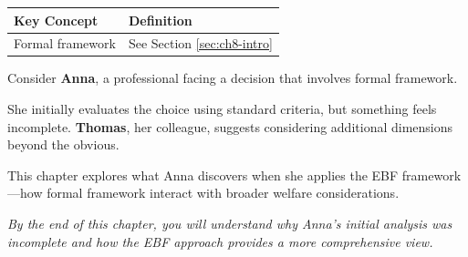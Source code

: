 %
%
%
%
%


\begin{tcolorbox}[
    colback=gray!5!white,
    colframe=gray!75!black,
    title={\textbf{Begriffe in diesem Kapitel}},
    fonttitle=\bfseries
]
\small
\begin{tabular}{@{}ll@{}}
\textbf{Key Concept} & \textbf{Definition} \\
\midrule
Formal framework & See Section \ref{sec:ch8-intro} \\
\end{tabular}
\end{tcolorbox}



\begin{tcolorbox}[
    colback=blue!5!white,
    colframe=blue!75!black,
    title={\textbf{Intuition: A Motivating Example}},
    fonttitle=\bfseries
]
Consider \textbf{Anna}, a professional facing a decision that involves formal framework.

She initially evaluates the choice using standard criteria, but something feels incomplete.
\textbf{Thomas}, her colleague, suggests considering additional dimensions beyond the obvious.

This chapter explores what Anna discovers when she applies the EBF framework---how
formal framework interact with broader welfare considerations.

\medskip
\textit{By the end of this chapter, you will understand why Anna's initial analysis
was incomplete and how the EBF approach provides a more comprehensive view.}
\end{tcolorbox}




